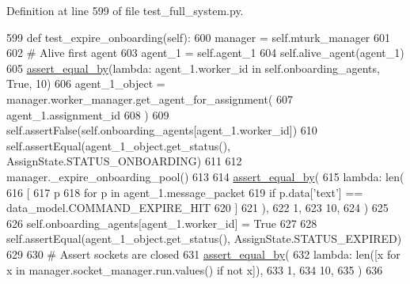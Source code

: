 Definition at line 599 of file test\+\_\+full\+\_\+system.\+py.


\begin{DoxyCode}
599     \textcolor{keyword}{def }test\_expire\_onboarding(self):
600         manager = self.mturk\_manager
601 
602         \textcolor{comment}{# Alive first agent}
603         agent\_1 = self.agent\_1
604         self.alive\_agent(agent\_1)
605         \hyperlink{namespaceparlai_1_1mturk_1_1core_1_1test_1_1test__full__system_a0b463246d35658a2e422010f13dcf819}{assert\_equal\_by}(\textcolor{keyword}{lambda}: agent\_1.worker\_id \textcolor{keywordflow}{in} self.onboarding\_agents, \textcolor{keyword}{True}, 10)
606         agent\_1\_object = manager.worker\_manager.get\_agent\_for\_assignment(
607             agent\_1.assignment\_id
608         )
609         self.assertFalse(self.onboarding\_agents[agent\_1.worker\_id])
610         self.assertEqual(agent\_1\_object.get\_status(), AssignState.STATUS\_ONBOARDING)
611 
612         manager.\_expire\_onboarding\_pool()
613 
614         \hyperlink{namespaceparlai_1_1mturk_1_1core_1_1test_1_1test__full__system_a0b463246d35658a2e422010f13dcf819}{assert\_equal\_by}(
615             \textcolor{keyword}{lambda}: len(
616                 [
617                     p
618                     \textcolor{keywordflow}{for} p \textcolor{keywordflow}{in} agent\_1.message\_packet
619                     \textcolor{keywordflow}{if} p.data[\textcolor{stringliteral}{'text'}] == data\_model.COMMAND\_EXPIRE\_HIT
620                 ]
621             ),
622             1,
623             10,
624         )
625 
626         self.onboarding\_agents[agent\_1.worker\_id] = \textcolor{keyword}{True}
627 
628         self.assertEqual(agent\_1\_object.get\_status(), AssignState.STATUS\_EXPIRED)
629 
630         \textcolor{comment}{# Assert sockets are closed}
631         \hyperlink{namespaceparlai_1_1mturk_1_1core_1_1test_1_1test__full__system_a0b463246d35658a2e422010f13dcf819}{assert\_equal\_by}(
632             \textcolor{keyword}{lambda}: len([x \textcolor{keywordflow}{for} x \textcolor{keywordflow}{in} manager.socket\_manager.run.values() \textcolor{keywordflow}{if} \textcolor{keywordflow}{not} x]),
633             1,
634             10,
635         )
636 
\end{DoxyCode}
\mbox{\label{classparlai_1_1mturk_1_1core_1_1legacy__2018_1_1test_1_1test__full__system_1_1TestMTurkManagerWorkflows_a9b6327cbeb64e4ddfb0154001660bede}} 

